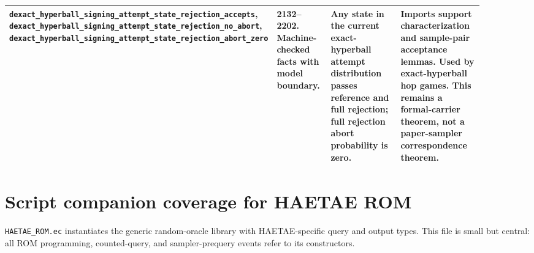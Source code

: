 \documentclass[11pt]{report}
\DeclareRobustCommand{\file}[1]{\ifmmode\text{\nolinkurl{#1}}\else\nolinkurl{#1}\fi}
\DeclareRobustCommand{\ec}[1]{\ifmmode\text{\nolinkurl{#1}}\else\nolinkurl{#1}\fi}
\theoremstyle{definition}
\theoremstyle{plain}
\begin{document}
{\begin{longtable}{p{0.25\linewidth}p{0.14\linewidth}p{0.27\linewidth}p{0.24\linewidth}}
\ec{dexact\_hyperball\_signing\_attempt\_state\_rejection\_accepts},
\ec{dexact\_hyperball\_signing\_attempt\_state\_rejection\_no\_abort},
\ec{dexact\_hyperball\_signing\_attempt\_state\_rejection\_abort\_zero} &
2132--2202. Machine-checked facts with model boundary. &
Any state in the current exact-hyperball attempt distribution passes reference
and full rejection; full rejection abort probability is zero. &
Imports support characterization and sample-pair acceptance lemmas.  Used by
exact-hyperball hop games.  This remains a formal-carrier theorem, not a
paper-sampler correspondence theorem. \\
\bottomrule
\end{longtable}
}

\section{Script companion coverage for HAETAE ROM}

\file{HAETAE\_ROM.ec} instantiates the generic random-oracle library with
HAETAE-specific query and output types.  This file is small but central:
all ROM programming, counted-query, and sampler-prequery events refer to its
constructors.
\end{document}
